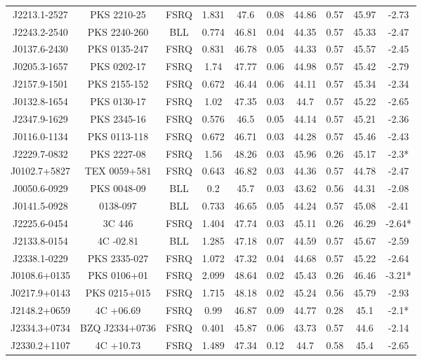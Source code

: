 \documentclass[12pt]{article}
\begin{document}
\begin{landscape}
\begin{longtable}{cccccccccc}
J2213.1-2527 & PKS 2210-25 & FSRQ & 1.831 & 47.6 & 0.08 & 44.86 & 0.57 & 45.97 & -2.73 \\
J2243.2-2540 & PKS 2240-260 & BLL & 0.774 & 46.81 & 0.04 & 44.35 & 0.57 & 45.33 & -2.47 \\
J0137.6-2430 & PKS 0135-247 & FSRQ & 0.831 & 46.78 & 0.05 & 44.33 & 0.57 & 45.57 & -2.45 \\
J0205.3-1657 & PKS 0202-17 & FSRQ & 1.74 & 47.77 & 0.06 & 44.98 & 0.57 & 45.42 & -2.79 \\
J2157.9-1501 & PKS 2155-152 & FSRQ & 0.672 & 46.44 & 0.06 & 44.11 & 0.57 & 45.34 & -2.34 \\
J0132.8-1654 & PKS 0130-17 & FSRQ & 1.02 & 47.35 & 0.03 & 44.7 & 0.57 & 45.22 & -2.65 \\
J2347.9-1629 & PKS 2345-16 & FSRQ & 0.576 & 46.5 & 0.05 & 44.14 & 0.57 & 45.21 & -2.36 \\
J0116.0-1134 & PKS 0113-118 & FSRQ & 0.672 & 46.71 & 0.03 & 44.28 & 0.57 & 45.46 & -2.43 \\
J2229.7-0832 & PKS 2227-08 & FSRQ & 1.56 & 48.26 & 0.03 & 45.96 & 0.26 & 45.17 & -2.3* \\
J0102.7+5827 & TEX 0059+581 & FSRQ & 0.643 & 46.82 & 0.03 & 44.36 & 0.57 & 44.78 & -2.47 \\
J0050.6-0929 & PKS 0048-09 & BLL & 0.2 & 45.7 & 0.03 & 43.62 & 0.56 & 44.31 & -2.08 \\
J0141.5-0928 & 0138-097 & BLL & 0.733 & 46.65 & 0.05 & 44.24 & 0.57 & 45.08 & -2.41 \\
J2225.6-0454 & 3C 446 & FSRQ & 1.404 & 47.74 & 0.03 & 45.11 & 0.26 & 46.29 & -2.64* \\
J2133.8-0154 & 4C -02.81 & BLL & 1.285 & 47.18 & 0.07 & 44.59 & 0.57 & 45.67 & -2.59 \\
J2338.1-0229 & PKS 2335-027 & FSRQ & 1.072 & 47.32 & 0.04 & 44.68 & 0.57 & 45.22 & -2.64 \\
J0108.6+0135 & PKS 0106+01 & FSRQ & 2.099 & 48.64 & 0.02 & 45.43 & 0.26 & 46.46 & -3.21* \\
J0217.9+0143 & PKS 0215+015 & FSRQ & 1.715 & 48.18 & 0.02 & 45.24 & 0.56 & 45.79 & -2.93 \\
J2148.2+0659 & 4C +06.69 & FSRQ & 0.99 & 46.87 & 0.09 & 44.77 & 0.28 & 45.1 & -2.1* \\
J2334.3+0734 & BZQ J2334+0736 & FSRQ & 0.401 & 45.87 & 0.06 & 43.73 & 0.57 & 44.6 & -2.14 \\
J2330.2+1107 & 4C +10.73 & FSRQ & 1.489 & 47.34 & 0.12 & 44.7 & 0.58 & 45.4 & -2.65 \\

\end{longtable}
\end{landscape}
\end{document}
